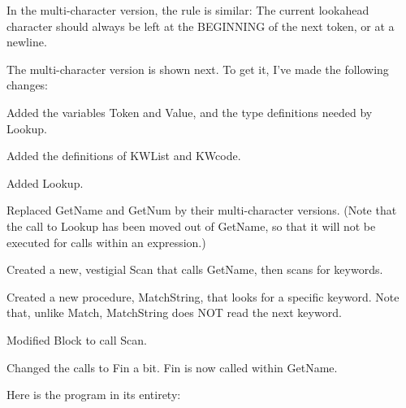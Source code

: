 \documentclass[float=false, crop=false]{standalone}
\begin{document}
In the multi-character version, the rule is similar: The current lookahead
character should always be left at the BEGINNING of the next token, or at a
newline.

The multi-character version is shown next. To get it, I've made the following
changes:

\begin{enumeration}
\item Added the variables Token and Value, and the type definitions needed by
   Lookup.

\item Added the definitions of KWList and KWcode.

\item Added Lookup.

\item Replaced GetName and GetNum by their multi-character versions.
   (Note that the call  to  Lookup has been moved out of GetName,
   so  that  it  will  not   be  executed  for  calls  within  an
   expression.)

\item Created a new,  vestigial  Scan that calls GetName, then scans
   for keywords.

\item Created  a  new  procedure,  MatchString,  that  looks  for  a
   specific keyword.  Note that, unlike  Match,  MatchString does
   NOT read the next keyword.

\item Modified Block to call Scan.

\item Changed the calls  to  Fin  a  bit.   Fin is now called within
   GetName.
\end{enumeration}

Here is the program in its entirety:
\end{document}

